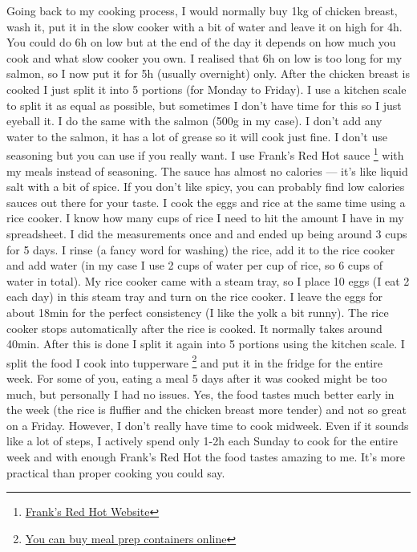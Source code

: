 \documentclass[openany, 12pt]{book}
\begin{document}
        Going back to my cooking process, I would normally buy 1kg of chicken breast, wash it, put it in the slow cooker with a bit of water and leave it on high for 4h.
        You could do 6h on low but at the end of the day it depends on how much you cook and what slow cooker you own. I realised that 6h on low is too long for my salmon,
        so I now put it for 5h (usually overnight) only. After the chicken breast is cooked I just
        split it into 5 portions (for Monday to Friday). I use a kitchen scale to split it as equal as possible, but sometimes I don't have time for this so I just eyeball it.
        I do the same with the salmon (500g in my case). I don't add any water to the salmon, it has a lot of grease so it will cook just fine. I don't use seasoning but you
        can use if you really want. I use Frank's Red Hot sauce
        \footnote{\href{https://www.franksredhot.com/}{Frank's Red Hot Website}} with my meals instead of seasoning.
        The sauce has almost no calories --- it's like liquid salt with a bit of spice. If you don't like spicy, you can probably find low calories sauces out there for your
        taste. I cook the eggs and rice at the same time using a rice cooker. I know how many cups of rice I need to hit the amount I have in my spreadsheet. I did the
        measurements once and and ended up being around 3 cups for 5 days. I rinse (a fancy word for washing) the rice, add it to the rice cooker and add water (in my case I use
        2 cups of water per cup of rice, so 6 cups of water in total). My rice cooker came with a steam tray, so I place 10 eggs (I eat 2 each day) in this steam tray and turn on
        the rice cooker. I leave the eggs for about 18min for the perfect consistency (I like the yolk a bit runny). The rice cooker stops automatically after the rice is cooked.
        It normally takes around 40min. After this is done I split it again into 5 portions using the kitchen scale. I split the food I cook into tupperware
        \footnote{\href{https://igluumealprep.com/}{You can buy meal prep containers online}} and put it in the
        fridge for the entire week. For some of you, eating a meal 5 days after it was cooked might be too much, but personally I had no issues. Yes, the food tastes much better
        early in the week (the rice is fluffier and the chicken breast more tender) and not so great on a Friday. However, I don't really have time to cook midweek. Even if it
        sounds like a lot of steps, I actively spend only 1-2h each Sunday to cook for the entire week and with enough Frank's Red Hot the food tastes amazing to me. It's more
        practical than proper cooking you could say.
\end{document}
